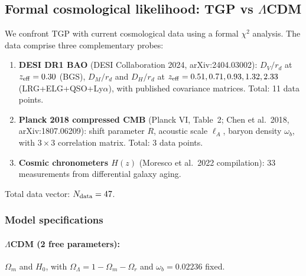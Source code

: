 
\subsection{Formal cosmological likelihood: TGP vs $\Lambda$CDM}%
\label{ssec:cosmo-likelihood}

We confront TGP with current cosmological data using a formal
$\chi^2$ analysis.  The data comprise three complementary probes:

\begin{enumerate}[nosep]
  \item \textbf{DESI DR1 BAO} (DESI Collaboration 2024, arXiv:2404.03002):
        $D_V/r_d$ at $z_{\rm eff}=0.30$ (BGS),
        $D_M/r_d$ and $D_H/r_d$ at $z_{\rm eff} = 0.51, 0.71, 0.93, 1.32, 2.33$
        (LRG+ELG+QSO+Ly$\alpha$), with published covariance matrices.
        Total: 11 data points.
  \item \textbf{Planck 2018 compressed CMB} (Planck VI, Table~2;
        Chen et al.\ 2018, arXiv:1807.06209):
        shift parameter $R$, acoustic scale $\ell_A$, baryon density
        $\omega_b$, with $3\times3$ correlation matrix.
        Total: 3 data points.
  \item \textbf{Cosmic chronometers $H(z)$} (Moresco et al.\ 2022
        compilation): 33 measurements from differential galaxy aging.
\end{enumerate}

\noindent Total data vector: $N_{\rm data} = 47$.

\subsubsection{Model specifications}

\paragraph{$\Lambda$CDM (2 free parameters):}
$\Omega_m$ and $H_0$, with $\Omega_\Lambda = 1 - \Omega_m - \Omega_r$
and $\omega_b = 0.02236$ fixed.

